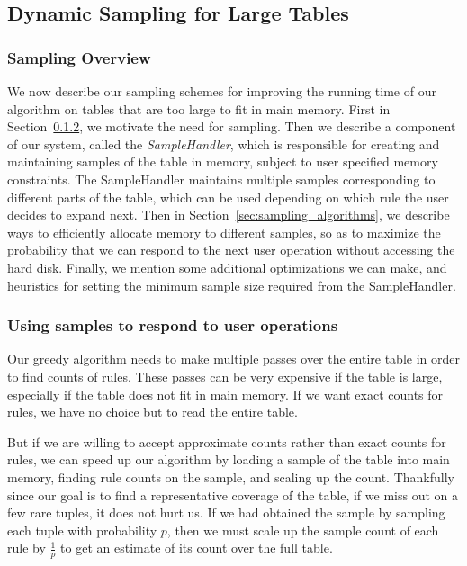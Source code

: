 \subsection{Dynamic Sampling for Large Tables}\label{sec:sampling}
\subsubsection{Sampling Overview}
We now describe our sampling schemes for improving the running time of our algorithm on tables that are too large to fit in main memory. First in Section~\ref{sec:sample-using}, we motivate the need for sampling. Then we describe a component of our system, called the {\em SampleHandler}, which is responsible for creating and maintaining samples of the table in memory, subject to user specified memory constraints. The SampleHandler maintains multiple samples corresponding to different parts of the table, which can be used depending on which rule the user decides to expand next. Then in Section~\ref{sec:sampling_algorithms}, we describe ways to efficiently allocate memory to different samples, so as to maximize the probability that we can respond to the next user operation without accessing the hard disk. Finally, we mention some additional optimizations we can make, and heuristics for setting the minimum sample size required from the SampleHandler.

\subsubsection{Using samples to respond to user operations}\label{sec:sample-using}
Our greedy algorithm needs to make multiple passes over the entire table in order to find counts of rules. These passes can be very expensive if the table is large, especially if the table does not fit in main memory. If we want exact counts for rules, we have no choice but to read the entire table. 

But if we are willing to accept approximate counts rather than exact counts for rules, we can speed up our algorithm by loading a sample of the table into main memory, finding rule counts on the sample, and scaling up the count. Thankfully since our goal is to find a representative coverage of the table,
if we miss out on a few rare tuples, it does not hurt us. If we had obtained the sample by sampling each tuple with probability $p$, then we must scale up the sample count of each rule by $\frac{1}{p}$ to get an estimate of its count over the full table. 

